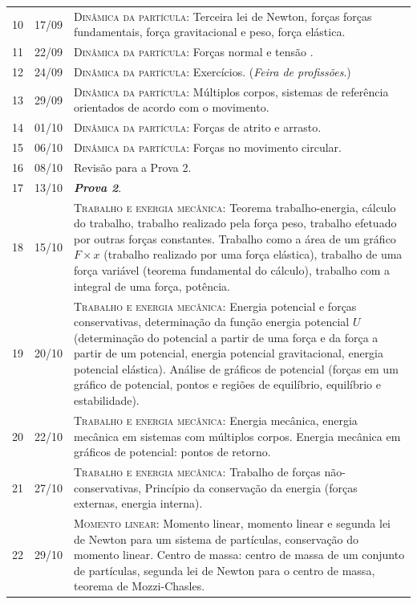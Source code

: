 \begin{center}
\begin{longtable}{ccp{70mm}}
10	 & 	17/09	 & 	\textsc{Dinâmica da partícula:} Terceira lei de Newton, forças forças fundamentais, força gravitacional e peso, força elástica. \\
11	 & 	22/09	 & 	\textsc{Dinâmica da partícula:} Forças normal e tensão .\\
12	 &  24/09	 &  \textsc{Dinâmica da partícula:} Exercícios. (\emph{Feira de profissões}.) \\
13	 & 	29/09	 & 	\textsc{Dinâmica da partícula:} Múltiplos corpos, sistemas de referência orientados de acordo com o movimento.\\
14	 & 	01/10	 & 	\textsc{Dinâmica da partícula:} Forças de atrito e arrasto. \\
15	 & 	06/10	 & 	\textsc{Dinâmica da partícula:} Forças no movimento circular. \\
16	 & 	08/10	 & 	Revisão para a Prova 2. \\
17	 & 	13/10	 & 	\textbf{\textit{Prova 2}}. \\
18	 & 	15/10	 &  	\textsc{Trabalho e energia mecânica:} Teorema trabalho-energia, cálculo do trabalho, trabalho realizado pela força peso, trabalho efetuado por outras forças constantes. Trabalho como a área de um gráfico $F \times x$ (trabalho realizado por uma força elástica), trabalho de uma força variável (teorema fundamental do cálculo), trabalho com a integral de uma força, potência. \\
19	 & 	20/10	 & 	\textsc{Trabalho e energia mecânica:} Energia potencial e forças conservativas, determinação da função energia potencial $U$ (determinação do potencial a partir de uma força e da força a partir de um potencial, energia potencial gravitacional, energia potencial elástica). Análise de gráficos de potencial (forças em um gráfico de potencial, pontos e regiões de equilíbrio, equilíbrio e estabilidade). \\
20	 & 	22/10	 & 	\textsc{Trabalho e energia mecânica:} Energia mecânica, energia mecânica em sistemas com múltiplos corpos. Energia mecânica em gráficos de potencial: pontos de retorno. \\
21	 & 	27/10	 & 	\textsc{Trabalho e energia mecânica:} Trabalho de forças não-conservativas, Princípio da conservação da energia (forças externas, energia interna). \\
22	 & 	29/10	 & 	\textsc{Momento linear:} Momento linear, momento linear e segunda lei de Newton para um sistema de partículas, conservação do momento linear. Centro de massa: centro de massa de um conjunto de partículas, segunda lei de Newton para o centro de massa, teorema de Mozzi-Chasles. \\

\end{longtable}
\end{center}
